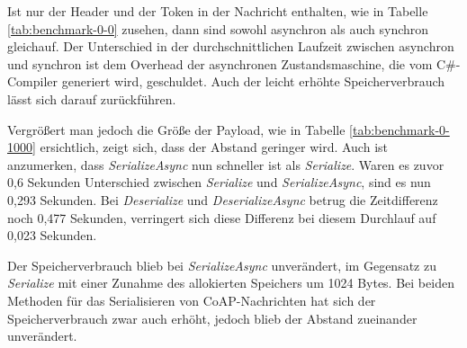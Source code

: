 Ist nur der Header und der Token in der Nachricht enthalten, wie in Tabelle \ref{tab:benchmark-0-0} zusehen, dann sind sowohl asynchron als auch synchron gleichauf. Der Unterschied in der durchschnittlichen Laufzeit zwischen asynchron und synchron ist dem Overhead der asynchronen Zustandsmaschine, die vom C\#-Compiler generiert wird, geschuldet. Auch der leicht erhöhte Speicherverbrauch lässt sich darauf zurückführen.

\begin{table}[h]
    \caption{Benchmark mit 0 Options und mit einer Payload von 1000 Bytes}
    \label{tab:benchmark-0-1000}
\end{table}

Vergrößert man jedoch die Größe der Payload, wie in Tabelle \ref{tab:benchmark-0-1000} ersichtlich, zeigt sich, dass der Abstand geringer wird. Auch ist anzumerken, dass \textit{SerializeAsync} nun schneller ist als \textit{Serialize}. Waren es zuvor 0,6 Sekunden Unterschied zwischen \textit{Serialize} und \textit{SerializeAsync}, sind es nun 0,293 Sekunden. Bei \textit{Deserialize} und \textit{DeserializeAsync} betrug die Zeitdifferenz noch 0,477 Sekunden, verringert sich diese Differenz bei diesem Durchlauf auf 0,023 Sekunden.

Der Speicherverbrauch blieb bei \textit{SerializeAsync} unverändert, im Gegensatz zu \textit{Serialize} mit einer Zunahme des allokierten Speichers um 1024 Bytes. Bei beiden Methoden für das Serialisieren von CoAP-Nachrichten hat sich der Speicherverbrauch zwar auch erhöht, jedoch blieb der Abstand zueinander unverändert.

